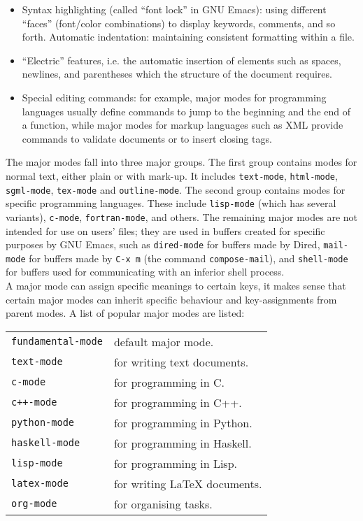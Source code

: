 \documentclass[12pt,a4paper,oneside]{article}
\begin{document}
\begin{itemize}
  \item Syntax highlighting (called ``font lock'' in GNU Emacs): using different ``faces'' (font/color combinations) to display keywords, comments, and so forth. Automatic indentation: maintaining consistent formatting within a file.
  \item ``Electric'' features, i.e. the automatic insertion of elements such as spaces, newlines, and parentheses which the structure of the document requires.
  \item Special editing commands: for example, major modes for programming languages usually define commands to jump to the beginning and the end of a function, while major modes for markup languages such as XML provide commands to validate documents or to insert closing tags.
\end{itemize}

The major modes fall into three major groups. The first group contains modes for normal text, either plain or with mark-up. It includes \texttt{text-mode}, \texttt{html-mode}, \texttt{sgml-mode}, \texttt{tex-mode} and \texttt{outline-mode}. The second group contains modes for specific programming languages. These include \texttt{lisp-mode} (which has several variants), \texttt{c-mode}, \texttt{fortran-mode}, and others. The remaining major modes are not intended for use on users' files; they are used in buffers created for specific purposes by GNU Emacs, such as \texttt{dired-mode} for buffers made by Dired,  \texttt{mail-mode} for buffers made by \texttt{C-x m} (the command \texttt{compose-mail}), and \texttt{shell-mode} for buffers used for communicating with an inferior shell process.\\

A major mode can assign specific meanings to certain keys, it makes sense that certain major modes can inherit specific behaviour and key-assignments from parent modes. A list of popular major modes are listed:\\

\begin{multicols}
  \begin{tabular}{@{}ll@{}}
    \texttt{fundamental-mode} & default major mode.\\
    \texttt{text-mode} & for writing text documents.\\
    \texttt{c-mode} & for programming in C.\\
    \texttt{c++-mode} & for programming in C++.\\
    \texttt{python-mode} & for programming in Python.\\
    \texttt{haskell-mode} & for programming in Haskell.\\
    \texttt{lisp-mode} & for programming in Lisp.\\
    \texttt{latex-mode} & for writing {\LaTeX} documents.\\
    \texttt{org-mode} & for organising tasks.
  \end{tabular}
\end{multicols}
\end{document}
